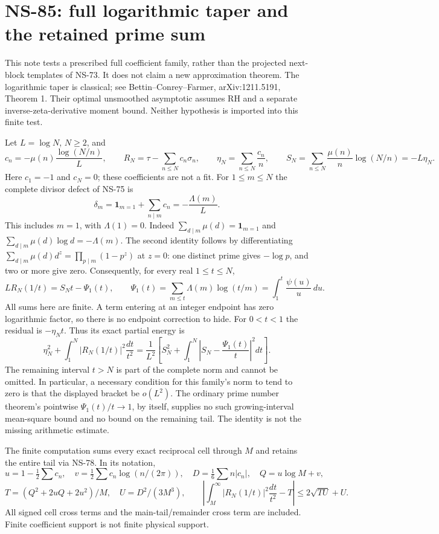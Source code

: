 \section*{NS-85: full logarithmic taper and the retained prime sum}

This note tests a prescribed full coefficient family, rather than the
projected next-block templates of NS-73. It does not claim a new
approximation theorem. The logarithmic taper is classical; see
Bettin--Conrey--Farmer, arXiv:1211.5191, Theorem 1. Their optimal
unsmoothed asymptotic assumes RH and a separate inverse-zeta-derivative
moment bound. Neither hypothesis is imported into this finite test.

Let $L=\log N$, $N\geq2$, and
\[
 c_n=-\mu(n)\frac{\log(N/n)}{L},\qquad
 R_N=\tau-\sum_{n\leq N}c_n\sigma_n,\qquad
 \eta_N=\sum_{n\leq N}\frac{c_n}{n},\qquad
 S_N=\sum_{n\leq N}\frac{\mu(n)}n\log(N/n)=-L\eta_N.
\]
Here $c_1=-1$ and $c_N=0$; these coefficients are not a fit.
For $1\leq m\leq N$ the complete divisor defect of NS-75 is
\[
 \delta_m=\mathbf1_{m=1}+\sum_{n\mid m}c_n
 =-\frac{\Lambda(m)}L.
\]
This includes $m=1$, with $\Lambda(1)=0$. Indeed
$\sum_{d\mid m}\mu(d)=\mathbf1_{m=1}$ and
$\sum_{d\mid m}\mu(d)\log d=-\Lambda(m)$.
The second identity follows by differentiating
$\sum_{d\mid m}\mu(d)d^z=\prod_{p\mid m}(1-p^z)$ at $z=0$:
one distinct prime gives $-\log p$, and two or more give zero.
Consequently, for every real $1\leq t\leq N$,
\begin{equation}
 L R_N(1/t)=S_Nt-\Psi_1(t),\qquad
 \Psi_1(t)=\sum_{m\leq t}\Lambda(m)\log(t/m)
          =\int_1^t\frac{\psi(u)}u\,du.
\end{equation}
All sums here are finite. A term entering at an integer endpoint has zero
logarithmic factor, so there is no endpoint correction to hide.
For $0<t<1$ the residual is $-\eta_Nt$. Thus its exact partial energy is
\[
 \eta_N^2+\int_1^N |R_N(1/t)|^2\frac{dt}{t^2}
 =\frac1{L^2}\left[S_N^2+
       \int_1^N\left|S_N-\frac{\Psi_1(t)}t\right|^2dt\right].
\]
The remaining interval $t>N$ is part of the complete norm and cannot be
omitted. In particular, a necessary condition for this family's norm to
tend to zero is that the displayed bracket be $o(L^2)$. The ordinary
prime number theorem's pointwise $\Psi_1(t)/t\to1$, by itself, supplies
no such growing-interval mean-square bound and no bound on the remaining
tail. The identity is not the missing arithmetic estimate.

The finite computation sums every exact reciprocal cell through $M$ and
retains the entire tail via NS-78. In its notation,
\[
 u=1-\tfrac12\sum c_n,\quad
 v=\tfrac12\sum c_n\log(n/(2\pi)),\quad
 D=\tfrac16\sum n|c_n|,\quad Q=u\log M+v,
\]
\[
 T=(Q^2+2uQ+2u^2)/M,\quad U=D^2/(3M^3),\qquad
 \left|\int_M^\infty |R_N(1/t)|^2\frac{dt}{t^2}-T\right|
 \leq2\sqrt{TU}+U.
\]
All signed cell cross terms and the main-tail/remainder cross term are
included. Finite coefficient support is not finite physical support.

